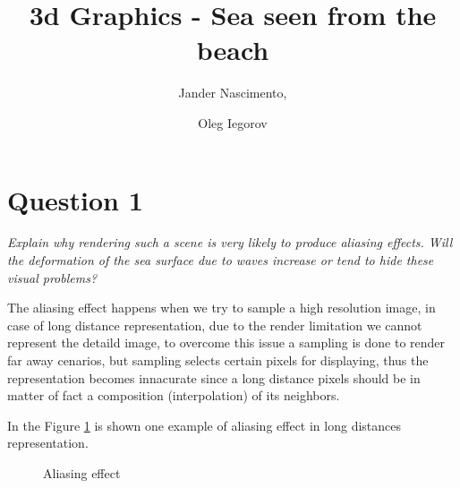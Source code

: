 \documentclass{report}
\begin{document}
\title{3d Graphics - Sea seen from the beach}

\author{Jander Nascimento, 
\and Oleg Iegorov}

\maketitle

\section{Question 1}

\emph{Explain why rendering such a scene is very likely to produce
aliasing effects. Will the deformation of the sea surface due to waves
increase or tend to hide these visual problems?}

The aliasing effect happens when we try to sample a high resolution image\cite{iaow}, in case of long distance representation, due to the render limitation we cannot represent the detaild image, to overcome this issue a sampling is done to render far away cenarios, but sampling selects certain pixels for displaying, thus the representation becomes innacurate since a long distance pixels should be in matter of fact a composition (interpolation) of its neighbors.

In the Figure \ref{fig:aliasing} is shown one example of aliasing effect in long distances representation.

\begin{figure}[H]
		  \centering
		  \hspace{0.1cm}
		  \caption{Aliasing effect}
		  \label{fig:aliasing}
\end{figure}
\end{document}
